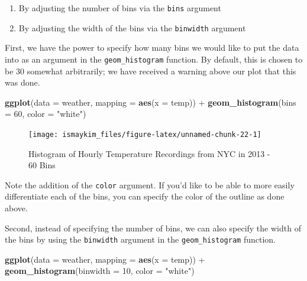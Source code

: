 \documentclass[]{tufte-book}
\newenvironment{Shaded}{\begin{snugshade}}{\end{snugshade}}
\newcommand{\KeywordTok}[1]{\textcolor[rgb]{0.13,0.29,0.53}{\textbf{{#1}}}}
\newcommand{\DataTypeTok}[1]{\textcolor[rgb]{0.13,0.29,0.53}{{#1}}}
\newcommand{\DecValTok}[1]{\textcolor[rgb]{0.00,0.00,0.81}{{#1}}}
\newcommand{\StringTok}[1]{\textcolor[rgb]{0.31,0.60,0.02}{{#1}}}
\newcommand{\NormalTok}[1]{{#1}}
\providecommand{\tightlist}{%
  \setlength{\itemsep}{0pt}\setlength{\parskip}{0pt}}
\theoremstyle{definition}
\theoremstyle{definition}
\theoremstyle{remark}
\begin{document}
\begin{enumerate}
\def\labelenumi{\arabic{enumi}.}
\tightlist
\item
  By adjusting the number of bins via the \texttt{bins} argument
\item
  By adjusting the width of the bins via the \texttt{binwidth} argument
\end{enumerate}

First, we have the power to specify how many bins we would like to put
the data into as an argument in the \texttt{geom\_histogram} function.
By default, this is chosen to be 30 somewhat arbitrarily; we have
received a warning above our plot that this was done.

\begin{Shaded}
\begin{Highlighting}[]
\KeywordTok{ggplot}\NormalTok{(}\DataTypeTok{data =} \NormalTok{weather, }\DataTypeTok{mapping =} \KeywordTok{aes}\NormalTok{(}\DataTypeTok{x =} \NormalTok{temp)) +}
\StringTok{  }\KeywordTok{geom_histogram}\NormalTok{(}\DataTypeTok{bins =} \DecValTok{60}\NormalTok{, }\DataTypeTok{color =} \StringTok{"white"}\NormalTok{)}
\end{Highlighting}
\end{Shaded}

\begin{figure}

{\centering \texttt{[image: ismaykim\_files/figure-latex/unnamed-chunk-22-1]} 

}

\caption[Histogram of Hourly Temperature Recordings from NYC in 2013 - 60 Bins]{Histogram of Hourly Temperature Recordings from NYC in 2013 - 60 Bins}\label{fig:unnamed-chunk-22}
\end{figure}

Note the addition of the \texttt{color} argument. If you'd like to be
able to more easily differentiate each of the bins, you can specify the
color of the outline as done above.

Second, instead of specifying the number of bins, we can also specify
the width of the bins by using the \texttt{binwidth} argument in the
\texttt{geom\_histogram} function.

\begin{Shaded}
\begin{Highlighting}[]
\KeywordTok{ggplot}\NormalTok{(}\DataTypeTok{data =} \NormalTok{weather, }\DataTypeTok{mapping =} \KeywordTok{aes}\NormalTok{(}\DataTypeTok{x =} \NormalTok{temp)) +}
\StringTok{  }\KeywordTok{geom_histogram}\NormalTok{(}\DataTypeTok{binwidth =} \DecValTok{10}\NormalTok{, }\DataTypeTok{color =} \StringTok{"white"}\NormalTok{)}
\end{Highlighting}
\end{Shaded}
\end{document}
